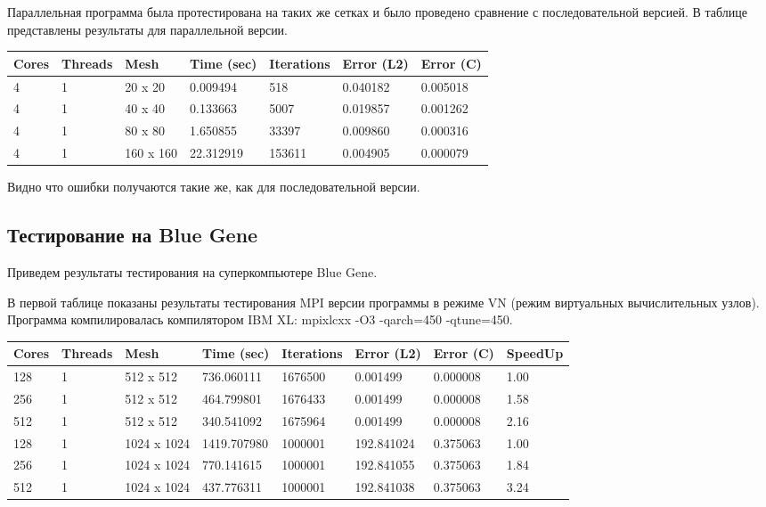 \documentclass[12pt]{article}
\begin{document}
Параллельная программа была протестирована на таких же сетках и было проведено сравнение
с последовательной версией. В таблице представлены результаты для параллельной версии.

\begin{center}
\begin{tabular}{lllllll}
Cores & Threads & Mesh & Time (sec) & Iterations & Error (L2) & Error (C) \\
\hline
4 & 1 & 20 x 20 & 0.009494 & 518 & 0.040182 & 0.005018 \\
4 & 1 & 40 x 40 & 0.133663 & 5007 & 0.019857 & 0.001262 \\
4 & 1 & 80 x 80 & 1.650855 & 33397 & 0.009860 & 0.000316 \\
4 & 1 & 160 x 160 & 22.312919 & 153611 & 0.004905 & 0.000079 \\
\hline
\end{tabular}
\end{center}
Видно что ошибки получаются такие же, как для последовательной версии.

\newpage

\subsection{Тестирование на Blue Gene}

Приведем результаты тестирования на суперкомпьютере Blue Gene. 

В первой таблице показаны результаты тестирования MPI версии программы в режиме VN (режим виртуальных вычислительных узлов).
Программа компилировалась компилятором IBM XL: mpixlcxx -O3 -qarch=450 -qtune=450.
\begin{center}
\begin{tabular}{llllllll}
Cores & Threads & Mesh & Time (sec) & Iterations & Error (L2) & Error (C) & SpeedUp \\
\hline
128 & 1 & 512 x 512 & 736.060111 & 1676500 & 0.001499 & 0.000008 & 1.00 \\	
256 & 1 & 512 x 512 & 464.799801 & 1676433 & 0.001499 & 0.000008 & 1.58 \\
512 & 1 & 512 x 512 & 340.541092 & 1675964 & 0.001499 & 0.000008 & 2.16 \\
\hline
128 & 1 & 1024 x 1024 & 1419.707980 & 1000001 & 192.841024 & 0.375063 & 1.00 \\
256 & 1 & 1024 x 1024 & 770.141615 & 1000001 & 192.841055 & 0.375063  & 1.84 \\
512 & 1 & 1024 x 1024 & 437.776311 & 1000001 & 192.841038 & 0.375063  & 3.24 \\
\hline
\end{tabular}
\end{center}
\end{document}
